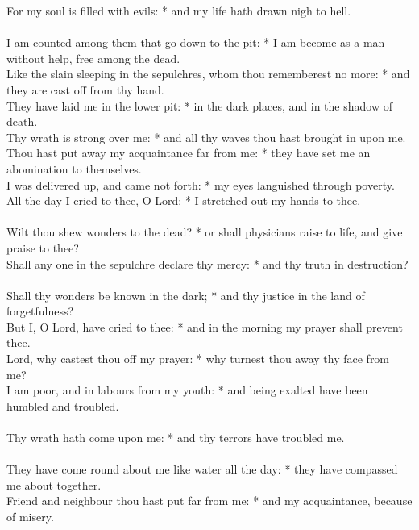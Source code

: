 \begin{Parallel}[v]{\colw}{\colx}
{{For my soul is filled with evils: * and my life hath drawn nigh to hell.\\ \\
I am counted among them that go down to the pit: * I am become as a man without help, free among the dead.\\
Like the slain sleeping in the sepulchres, whom thou rememberest no more: * and they are cast off from thy hand.\\
They have laid me in the lower pit: * in the dark places, and in the shadow of death.\\
Thy wrath is strong over me: * and all thy waves thou hast brought in upon me.\\
Thou hast put away my acquaintance far from me: * they have set me an abomination to themselves.\\
I was delivered up, and came not forth: * my eyes languished through poverty.\\
All the day I cried to thee, O Lord: * I stretched out my hands to thee.\\ \\
Wilt thou shew wonders to the dead? * or shall physicians raise to life, and give praise to thee?\\
Shall any one in the sepulchre declare thy mercy: * and thy truth in destruction?\\ \\
Shall thy wonders be known in the dark; * and thy justice in the land of forgetfulness?\\
But I, O Lord, have cried to thee: * and in the morning my prayer shall prevent thee.\\
Lord, why castest thou off my prayer: * why turnest thou away thy face from me?\\
I am poor, and in labours from my youth: * and being exalted have been humbled and troubled.\\ \\
Thy wrath hath come upon me: * and thy terrors have troubled me.\\ \\
They have come round about me like water all the day: * they have compassed me about together.\\
Friend and neighbour thou hast put far from me: * and my acquaintance, because of misery.}}

\end{Parallel}




